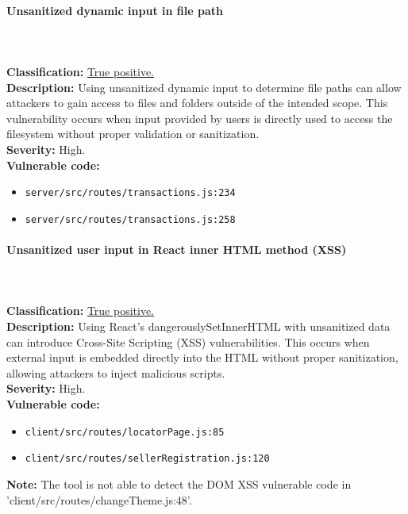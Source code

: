 \documentclass[]{article}
\begin{document}
\paragraph{Unsanitized dynamic input in file path} \mbox{} \\ \\
\textbf{Classification:} \hyperref[subsubsec:improper_limitation_of_a_pathname_to_a_restricted_directory]{True positive.} \\
\textbf{Description:} Using unsanitized dynamic input to determine file paths can allow attackers to gain access to files and folders outside of the intended scope. This vulnerability occurs when input provided by users is directly used to access the filesystem without proper validation or sanitization. \\ 
\textbf{Severity:} High. \\ 
\textbf{Vulnerable code:}
\begin{itemize}
    \item \texttt{server/src/routes/transactions.js:234}
    \item \texttt{server/src/routes/transactions.js:258}
\end{itemize}

\paragraph{Unsanitized user input in React inner HTML method (XSS)} \mbox{} \\ \\
\textbf{Classification:} \hyperref[subsubsec:cross_site_scripting]{True positive.} \\
\textbf{Description:} Using React's dangerouslySetInnerHTML with unsanitized data can introduce Cross-Site Scripting (XSS) vulnerabilities. This occurs when external input is embedded directly into the HTML without proper sanitization, allowing attackers to inject malicious scripts. \\ 
\textbf{Severity:} High. \\ 
\textbf{Vulnerable code:}
\begin{itemize}
    \item \texttt{client/src/routes/locatorPage.js:85}
    \item \texttt{client/src/routes/sellerRegistration.js:120}
\end{itemize}
\textbf{Note:} The tool is not able to detect the DOM XSS vulnerable code in 'client/src/routes/changeTheme.js:48'. \\
\end{document}
